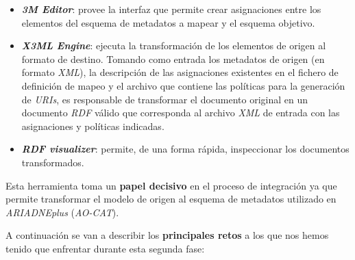 
\begin{itemize}
\tightlist
\item
  \emph{\textbf{3M Editor}}: provee la interfaz que permite crear asignaciones
  entre los elementos del esquema de metadatos a mapear y el esquema
  objetivo.
\end{itemize}


\begin{itemize}
\tightlist
\item
  \emph{\textbf{X3ML Engine}}: ejecuta la transformación de los elementos de
  origen al formato de destino. Tomando como entrada los metadatos de origen
  (en formato \emph{XML}), la descripción de las asignaciones existentes en el
  fichero de definición de mapeo y el archivo que contiene las políticas
  para la generación de \emph{URIs}, es responsable de transformar el documento
  original en un documento \emph{RDF} válido que corresponda al archivo \emph{XML} de
  entrada con las asignaciones y políticas indicadas.
\item
  \emph{\textbf{RDF visualizer}}: permite, de una forma rápida, inspeccionar los
  documentos transformados.
\end{itemize}


Esta herramienta toma un \textbf{papel decisivo} en el proceso de
integración ya que permite transformar el modelo de origen al esquema de
metadatos utilizado en \emph{ARIADNEplus} (\emph{AO-CAT}).

A continuación se van a describir los \textbf{principales \textbf{retos}} a los
que nos hemos tenido que enfrentar durante esta segunda fase:

